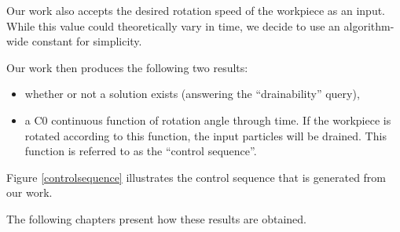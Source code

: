 Our work also accepts the desired rotation speed of the workpiece as an input. While this value could theoretically vary in time, we decide to use an algorithm-wide constant for simplicity.

Our work then produces the following two results:

\begin{itemize}
\item whether or not a solution exists (answering the ``drainability'' query),
\item a C0 continuous function of rotation angle through time. If the workpiece is rotated according to this function, the input particles will be drained. This function is referred to as the ``control sequence''.
\end{itemize}

Figure \ref{controlsequence} illustrates the control sequence that is generated from our work.


The following chapters present how these results are obtained.


